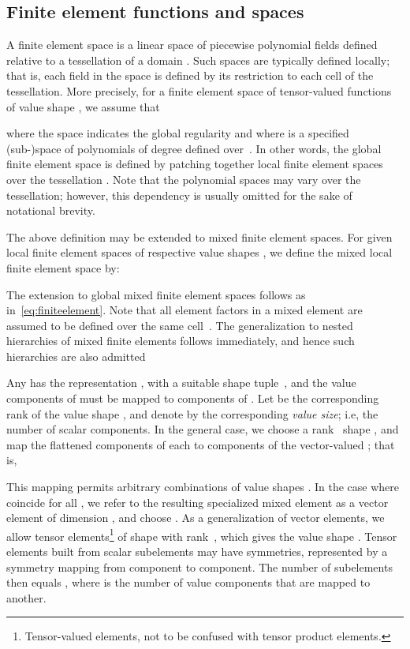 \documentclass[prodmode,acmtoms]{acmsmall}
\begin{document}
\subsection{Finite element functions and spaces}
\label{sec:finite_element}

A finite element space  is a linear space of piecewise
polynomial fields defined relative to a tessellation  of a domain . Such spaces are typically defined
locally; that is, each field in the space is defined by its
restriction to each cell of the tessellation. More precisely, for a
finite element space  of tensor-valued functions of value
shape , we assume that

where the space  indicates the global regularity and
where  is a specified (sub-)space of
polynomials of degree  defined over~. In other
words, the global finite element space  is defined by patching
together local finite element spaces  over the
tessellation . Note that the polynomial spaces may vary
over the tessellation; however, this dependency is usually omitted for
the sake of notational brevity.

The above definition may be extended to mixed finite element spaces.
For given local finite element spaces  of
respective value shapes , we define the mixed local
finite element space  by:

The extension to global mixed finite element spaces follows as
in~\eqref{eq:finiteelement}.  Note that all element factors in a mixed
element are assumed to be defined over the same cell~. The
generalization to nested hierarchies of mixed finite elements follows
immediately, and hence such hierarchies are also admitted

Any  has the representation , with a suitable shape tuple~, and the value components of
 must be mapped to components of . Let 
be the corresponding rank of the value shape , and denote by
 the corresponding \emph{value size};
i.e, the number of scalar components. In the general case, we choose a
rank~ shape , and map the flattened
components of each  to components of the vector-valued ; that
is,

This mapping permits arbitrary combinations of value shapes . In
the case where  coincide for all , we refer to
the resulting specialized mixed element as a vector element of
dimension , and choose . As a
generalization of vector elements, we allow tensor
elements\footnote{Tensor-valued elements, not to be confused with
  tensor product elements.} of shape  with rank~, which gives
the value shape . Tensor elements built from scalar subelements may have
symmetries, represented by a symmetry mapping from component to
component.  The number of subelements then equals
, where  is the number of
value components that are mapped to another.
\end{document}
